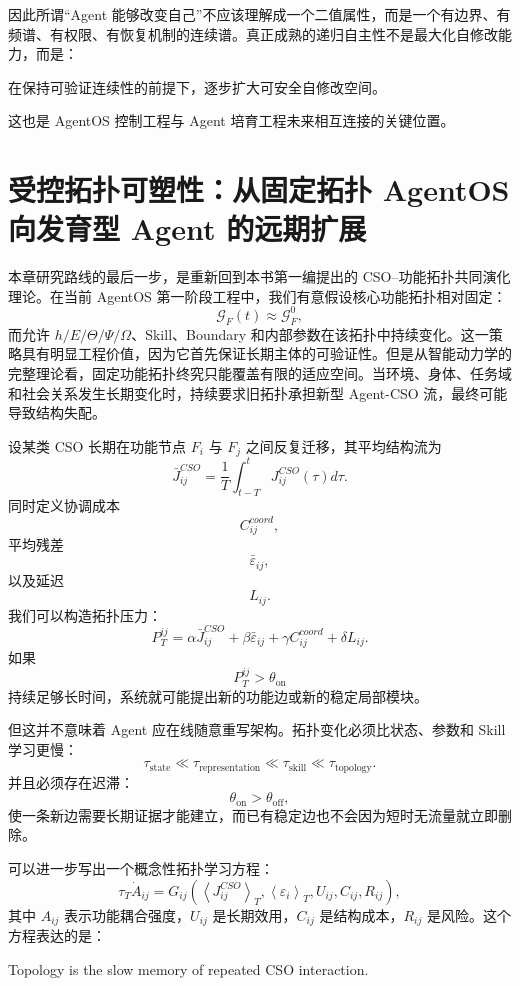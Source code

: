 因此所谓``Agent 能够改变自己''不应该理解成一个二值属性，而是一个有边界、有频谱、有权限、有恢复机制的连续谱。真正成熟的递归自主性不是最大化自修改能力，而是：
\begin{remark}
在保持可验证连续性的前提下，逐步扩大可安全自修改空间。
\end{remark}
这也是 AgentOS 控制工程与 Agent 培育工程未来相互连接的关键位置。

\section{受控拓扑可塑性：从固定拓扑 AgentOS 向发育型 Agent 的远期扩展}

本章研究路线的最后一步，是重新回到本书第一编提出的 CSO--功能拓扑共同演化理论。在当前 AgentOS 第一阶段工程中，我们有意假设核心功能拓扑相对固定：
\[
\mathcal G_F(t)
\approx
\mathcal G_F^0,
\]
而允许 $h/E/\Theta/\Psi/\Omega$、Skill、Boundary 和内部参数在该拓扑中持续变化。这一策略具有明显工程价值，因为它首先保证长期主体的可验证性。但是从智能动力学的完整理论看，固定功能拓扑终究只能覆盖有限的适应空间。当环境、身体、任务域和社会关系发生长期变化时，持续要求旧拓扑承担新型 Agent-CSO 流，最终可能导致结构失配。

设某类 CSO 长期在功能节点 $F_i$ 与 $F_j$ 之间反复迁移，其平均结构流为
\[
\bar J_{ij}^{CSO}
=
\frac{1}{T}
\int_{t-T}^{t}
J_{ij}^{CSO}(\tau)d\tau.
\]
同时定义协调成本
\[
C_{ij}^{coord},
\]
平均残差
\[
\bar\varepsilon_{ij},
\]
以及延迟
\[
L_{ij}.
\]
我们可以构造拓扑压力：
\[
P_T^{ij}
=
\alpha
\bar J_{ij}^{CSO}
+
\beta
\bar\varepsilon_{ij}
+
\gamma
C_{ij}^{coord}
+
\delta
L_{ij}.
\]
如果
\[
P_T^{ij}
>
\theta_{\mathrm{on}}
\]
持续足够长时间，系统就可能提出新的功能边或新的稳定局部模块。

但这并不意味着 Agent 应在线随意重写架构。拓扑变化必须比状态、参数和 Skill 学习更慢：
\[
\tau_{\mathrm{state}}
\ll
\tau_{\mathrm{representation}}
\ll
\tau_{\mathrm{skill}}
\ll
\tau_{\mathrm{topology}}.
\]
并且必须存在迟滞：
\[
\theta_{\mathrm{on}}
>
\theta_{\mathrm{off}},
\]
使一条新边需要长期证据才能建立，而已有稳定边也不会因为短时无流量就立即删除。

可以进一步写出一个概念性拓扑学习方程：
\[
\tau_T\dot A_{ij}
=
G_{ij}
\left(
\left\langle
J_{ij}^{CSO}
\right\rangle_T,
\left\langle
\varepsilon_i
\right\rangle_T,
U_{ij},
C_{ij},
R_{ij}
\right),
\]
其中 $A_{ij}$ 表示功能耦合强度，$U_{ij}$ 是长期效用，$C_{ij}$ 是结构成本，$R_{ij}$ 是风险。这个方程表达的是：
\begin{statementbox}
Topology is the slow memory of repeated CSO interaction.
\end{statementbox}

